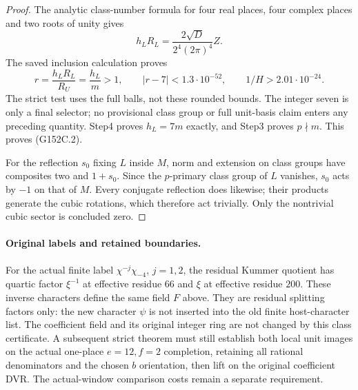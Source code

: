 \begin{proof}
The analytic class-number formula for four real places,
four complex places and two roots of unity gives
\[
               h_LR_L=\frac{2\sqrt D}{2^4(2\pi)^4}Z.
 \tag{G152C.25}
\]
The saved inclusion calculation proves
\[
 r=\frac{h_LR_L}{R_U}=\frac{h_L}{m}>1,
 \qquad |r-7|<1.3\cdot10^{-52},\qquad
                         1/H>2.01\cdot10^{-24}.
 \tag{G152C.26}
\]
The strict test uses the full balls, not these rounded bounds.
The integer seven is only a final selector; no provisional
class group or full unit-basis claim enters any preceding quantity.
Step4 proves $h_L=7m$ exactly, and Step3 proves $p\nmid m$.
This proves (G152C.2).

For the reflection $s_0$ fixing $L$ inside $M$, norm and
extension on class groups have composites two and $1+s_0$.
Since the $p$-primary class group of $L$ vanishes, $s_0$ acts
by $-1$ on that of $M$.
Every conjugate reflection does likewise; their products
generate the cubic rotations, which therefore act trivially.
Only the nontrivial cubic sector is concluded zero.
\end{proof}

\paragraph{Original labels and retained boundaries.}
For the actual finite label $\chi^{-j}\chi_{-4}$, $j=1,2$,
the residual Kummer quotient has quartic factor $\xi^{-1}$
at effective residue $66$ and $\xi$ at effective residue $200$.
These inverse characters define the same field $F$ above.
They are residual splitting factors only: the new character
$\psi$ is not inserted into the old finite host-character list.
The coefficient field and its original integer ring are not
changed by this class certificate.
A subsequent strict theorem must still establish both local
unit images on the actual one-place $e=12,f=2$ completion,
retaining all rational denominators and the chosen $b$ orientation,
then lift on the original coefficient DVR.
The actual-window comparison costs remain a separate requirement.

